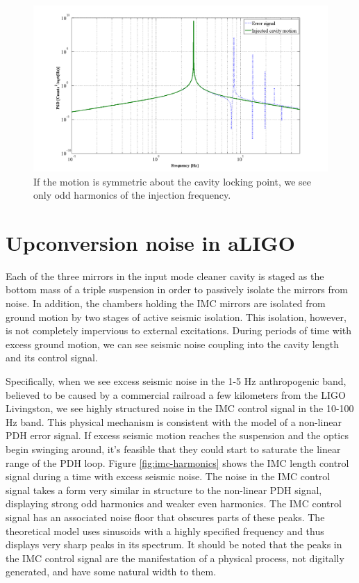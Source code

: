 \begin{figure}[h!]
\includegraphics[height=0.6\textwidth]{figures/IMCUpconversion/symmetric_PDH.png}
\caption[PDH response to symmetric cavity motion]{If the motion is symmetric about the cavity locking point, we see only odd harmonics of the injection frequency.}
\label{fig:symmetric-pdh}
\end{figure}

\section{Upconversion noise in aLIGO}
Each of the three mirrors in the input mode cleaner cavity is staged as the bottom 
mass of a triple suspension in order to passively isolate the mirrors from noise. 
In addition, the chambers holding the IMC mirrors are isolated from ground motion by 
two stages of active seismic isolation. This isolation, however, is not completely 
impervious to external excitations. During periods of time with excess ground motion, 
we can see seismic noise coupling into the cavity length and its control signal.

Specifically, when we see excess seismic noise in the 1-5 Hz anthropogenic band, 
believed to be caused by a commercial railroad a few kilometers from the LIGO 
Livingston, we see highly structured noise in the IMC control signal in the 10-100 Hz 
band. This physical mechanism is consistent with the model of a non-linear PDH error 
signal. If excess seismic motion reaches the suspension and the optics begin swinging 
around, it's feasible that they could start to saturate the linear range of the PDH loop.
Figure \ref{fig:imc-harmonics} shows the IMC length control signal during a time 
with excess seismic noise. 
The noise in the IMC control signal 
takes a form very similar in structure to the non-linear PDH signal, displaying 
strong odd harmonics and weaker even harmonics. The IMC control signal has an associated 
noise floor that obscures parts of these peaks. The theoretical model uses sinusoids with 
a highly specified frequency and thus displays very sharp peaks in its spectrum. 
It should be noted that the peaks in the IMC control signal are the manifestation of 
a physical process, not digitally generated, and have some natural width to them.

